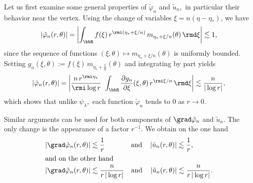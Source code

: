 \begin{proofc}
\setcounter{stepcount}{0}
\begin{step}\label{listproofprop3.7.1}
Let us first examine some general properties of $\tilde\varphi_n$ and $\tilde u_n,$ in particular their behavior near the vertex. Using the change of variables $\xi = n(\eta - \eta_*)$, we have
\begin{equation}\label{e.estim1}
\left| \tilde\varphi_n(r,\theta) \right| = \left| \int_{\bbR} f(\xi)\, r^{\rmi (\eta_* + \xi/n)}\, m_{\eta_* + \xi/n}(\theta)\, \rmd \xi \right|
\lesssim 1,
\end{equation}
since the sequence of functions $(\xi,\theta) \mapsto m_{\eta_* + \xi/n}(\theta)$ is uniformly bounded. Setting $g_n(\xi,\theta) := f(\xi)\, m_{\eta_* + \frac{\xi}{n}}(\theta)$ and integrating by part yields
\[
\left| \tilde\varphi_n(r,\theta) \right| = \left| \frac{n\,r^{\rmi\eta_*}}{\rmi \log r}\ \int_{\bbR} \frac{\partial g_n}{\partial \xi}(\xi,\theta)\, r^{\rmi \xi/n}\, \rmd \xi \right|
\lesssim \frac{n}{|\log r|},
\]
which shows that unlike $\psi_\lambda,$ each function $\tilde\varphi_n$ tends to 0 as $r \to 0.$

Similar arguments can be used for both components of $\grad\tilde\varphi_n$ and $\tilde u_n.$ The only change is the appearance of a factor $r^{-1}.$ We obtain on the one hand
\begin{align}
\left| \grad\tilde\varphi_n(r,\theta) \right| &\lesssim \frac{1}{r}\mkern 68mu\text{and}
\quad\left| \tilde u_n(r,\theta) \right| \lesssim \frac{1}{r},\label{e.estim3}\\
\intertext{and on the other hand}
\left| \grad\tilde\varphi_n(r,\theta) \right| &\lesssim \frac{n}{r\,|\log r|}
 \quad\text{and}\quad
\left| \tilde u_n(r,\theta) \right| \lesssim \frac{n}{r\,|\log r|}.\label{e.estim4}
\end{align}
\end{step}


\end{proofc}
